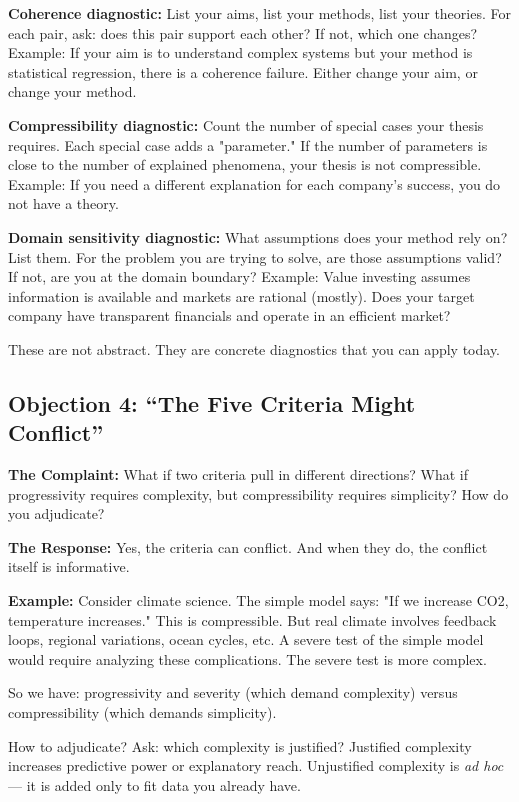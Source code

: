 \documentclass[11pt,letterpaper]{article}
\begin{document}
\textbf{Coherence diagnostic:} List your aims, list your methods, list your theories. For each pair, ask: does this pair support each other? If not, which one changes? Example: If your aim is to understand complex systems but your method is statistical regression, there is a coherence failure. Either change your aim, or change your method.

\textbf{Compressibility diagnostic:} Count the number of special cases your thesis requires. Each special case adds a "parameter." If the number of parameters is close to the number of explained phenomena, your thesis is not compressible. Example: If you need a different explanation for each company's success, you do not have a theory.

\textbf{Domain sensitivity diagnostic:} What assumptions does your method rely on? List them. For the problem you are trying to solve, are those assumptions valid? If not, are you at the domain boundary? Example: Value investing assumes information is available and markets are rational (mostly). Does your target company have transparent financials and operate in an efficient market?

These are not abstract. They are concrete diagnostics that you can apply today.

\subsection*{Objection 4: ``The Five Criteria Might Conflict''}

\textbf{The Complaint:} What if two criteria pull in different directions? What if progressivity requires complexity, but compressibility requires simplicity? How do you adjudicate?

\textbf{The Response:} Yes, the criteria can conflict. And when they do, the conflict itself is informative.

\textbf{Example:} Consider climate science. The simple model says: "If we increase CO2, temperature increases." This is compressible. But real climate involves feedback loops, regional variations, ocean cycles, etc. A severe test of the simple model would require analyzing these complications. The severe test is more complex.

So we have: progressivity and severity (which demand complexity) versus compressibility (which demands simplicity).

How to adjudicate? Ask: which complexity is justified? Justified complexity increases predictive power or explanatory reach. Unjustified complexity is \emph{ad hoc} — it is added only to fit data you already have.
\end{document}
